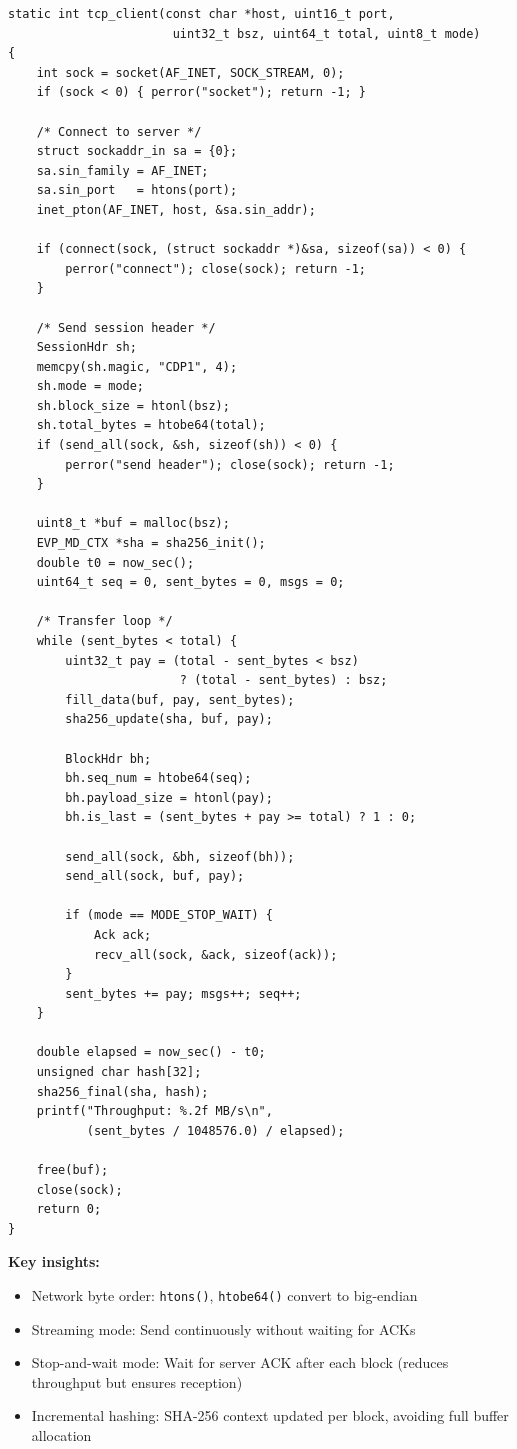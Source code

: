 \documentclass[12pt,a4paper]{article}
\begin{document}
\begin{lstlisting}[caption=TCP Client Implementation (excerpt),label=lst:tcp_client]
static int tcp_client(const char *host, uint16_t port,
                       uint32_t bsz, uint64_t total, uint8_t mode)
{
    int sock = socket(AF_INET, SOCK_STREAM, 0);
    if (sock < 0) { perror("socket"); return -1; }
    
    /* Connect to server */
    struct sockaddr_in sa = {0};
    sa.sin_family = AF_INET;
    sa.sin_port   = htons(port);
    inet_pton(AF_INET, host, &sa.sin_addr);
    
    if (connect(sock, (struct sockaddr *)&sa, sizeof(sa)) < 0) {
        perror("connect"); close(sock); return -1;
    }
    
    /* Send session header */
    SessionHdr sh;
    memcpy(sh.magic, "CDP1", 4);
    sh.mode = mode;
    sh.block_size = htonl(bsz);
    sh.total_bytes = htobe64(total);
    if (send_all(sock, &sh, sizeof(sh)) < 0) {
        perror("send header"); close(sock); return -1;
    }
    
    uint8_t *buf = malloc(bsz);
    EVP_MD_CTX *sha = sha256_init();
    double t0 = now_sec();
    uint64_t seq = 0, sent_bytes = 0, msgs = 0;
    
    /* Transfer loop */
    while (sent_bytes < total) {
        uint32_t pay = (total - sent_bytes < bsz) 
                        ? (total - sent_bytes) : bsz;
        fill_data(buf, pay, sent_bytes);
        sha256_update(sha, buf, pay);
        
        BlockHdr bh;
        bh.seq_num = htobe64(seq);
        bh.payload_size = htonl(pay);
        bh.is_last = (sent_bytes + pay >= total) ? 1 : 0;
        
        send_all(sock, &bh, sizeof(bh));
        send_all(sock, buf, pay);
        
        if (mode == MODE_STOP_WAIT) {
            Ack ack;
            recv_all(sock, &ack, sizeof(ack));
        }
        sent_bytes += pay; msgs++; seq++;
    }
    
    double elapsed = now_sec() - t0;
    unsigned char hash[32];
    sha256_final(sha, hash);
    printf("Throughput: %.2f MB/s\n", 
           (sent_bytes / 1048576.0) / elapsed);
    
    free(buf);
    close(sock);
    return 0;
}
\end{lstlisting}

\textbf{Key insights:}
\begin{itemize}
  \item Network byte order: \texttt{htons()}, \texttt{htobe64()} convert to big-endian
  \item Streaming mode: Send continuously without waiting for ACKs
  \item Stop-and-wait mode: Wait for server ACK after each block (reduces throughput but ensures reception)
  \item Incremental hashing: SHA-256 context updated per block, avoiding full buffer allocation
\end{itemize}
\end{document}
